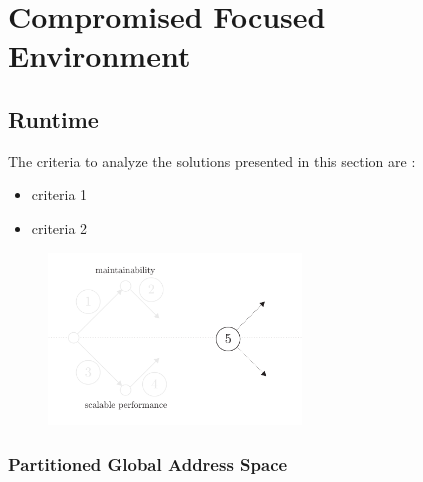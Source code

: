\section{Compromised Focused Environment} \label{chapter3:software-abstraction}





\subsection{Runtime}

The criteria to analyze the solutions presented in this section are :
\begin{itemize}
\item criteria 1
\item criteria 2
\end{itemize}


\begin{figure}[h!]
\begin{center}
\includegraphics[width=0.6\textwidth]{../ressources/state-of-the-art-5.pdf}
\end{center}
\caption{}
\label{fig:state-of-the-art-5}
\end{figure}





\subsubsection{Partitioned Global Address Space}

